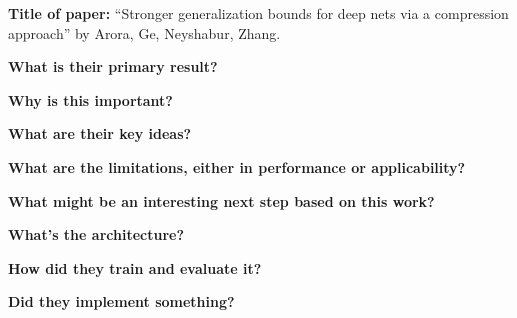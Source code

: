 \noindent \textbf{Title of paper:} ``Stronger generalization bounds for deep
nets via a compression approach'' by Arora, Ge, Neyshabur, Zhang. 

\noindent\textbf{What is their primary result?}

\noindent\textbf{Why is this important?}

\noindent\textbf{What are their key ideas?}

\noindent\textbf{What are the limitations, either in performance or applicability?}

\noindent\textbf{What might be an interesting next step based on this work?}

\noindent\textbf{What's the architecture?}

\noindent\textbf{How did they train and evaluate it?}

\noindent\textbf{Did they implement something?}

